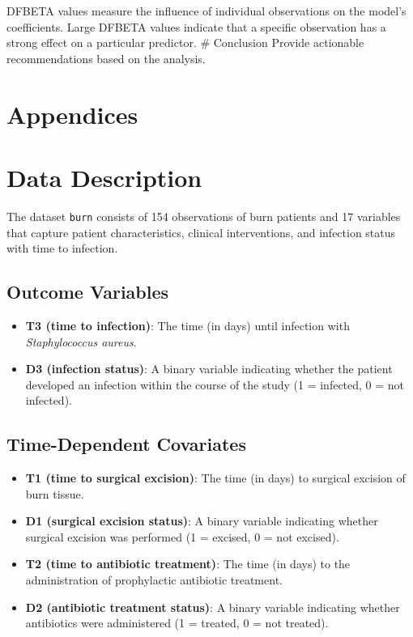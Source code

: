 \documentclass[12pt]{article}
\providecommand{\tightlist}{%
  \setlength{\itemsep}{0pt}\setlength{\parskip}{0pt}}
\begin{document}
DFBETA values measure the influence of individual observations on the
model's coefficients. Large DFBETA values indicate that a specific
observation has a strong effect on a particular predictor. \# Conclusion
Provide actionable recommendations based on the analysis.

\section{Appendices}\label{appendices}

\section{Data Description}\label{data-description}

The dataset \texttt{burn} consists of 154 observations of burn patients
and 17 variables that capture patient characteristics, clinical
interventions, and infection status with time to infection.

\subsection{\texorpdfstring{\textbf{Outcome
Variables}}{Outcome Variables}}\label{outcome-variables}

\begin{itemize}
\tightlist
\item
  \textbf{T3 (time to infection)}: The time (in days) until infection
  with \emph{Staphylococcus aureus}.
\item
  \textbf{D3 (infection status)}: A binary variable indicating whether
  the patient developed an infection within the course of the study (1 =
  infected, 0 = not infected).
\end{itemize}

\subsection{\texorpdfstring{\textbf{Time-Dependent
Covariates}}{Time-Dependent Covariates}}\label{time-dependent-covariates}

\begin{itemize}
\tightlist
\item
  \textbf{T1 (time to surgical excision)}: The time (in days) to
  surgical excision of burn tissue.
\item
  \textbf{D1 (surgical excision status)}: A binary variable indicating
  whether surgical excision was performed (1 = excised, 0 = not
  excised).
\item
  \textbf{T2 (time to antibiotic treatment)}: The time (in days) to the
  administration of prophylactic antibiotic treatment.
\item
  \textbf{D2 (antibiotic treatment status)}: A binary variable
  indicating whether antibiotics were administered (1 = treated, 0 = not
  treated).
\end{itemize}
\end{document}
